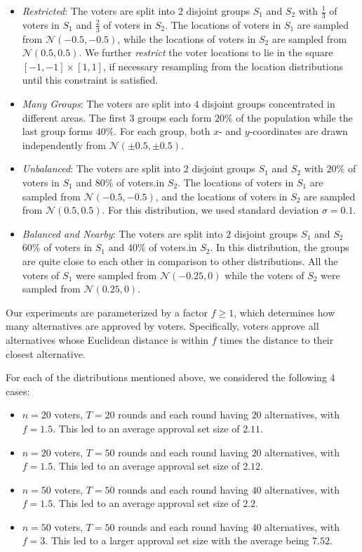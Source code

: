 \documentclass[10pt]{scrartcl}
\theoremstyle{plain}
\theoremstyle{definition}
\renewcommand*{\ge}{\geqslant}
\begin{document}
\begin{itemize}[leftmargin=15pt]
	
	\item \emph{Restricted}: The voters are split into $2$ disjoint groups $S_1$ and $S_2$ with $\frac13$ of voters in $S_1$ and $\frac23$ of voters in $S_2$. The locations of voters in $S_1$ are sampled from $\mathcal{N}(-0.5, -0.5)$, while the locations of voters in $S_2$ are sampled from $\mathcal{N}(0.5, 0.5)$. We further \emph{restrict} the voter locations to lie in the square $[-1, -1] \times [1, 1]$, if necessary resampling from the location distributions until this constraint is satisfied.
	
	\item \emph{Many Groups}: The voters are split into $4$ disjoint groups concentrated in different areas. The first $3$ groups each form $20\%$ of the population while the last group forms $40\%$. For each group, both $x$- and $y$-coordinates are drawn independently from $\mathcal{N}(\pm 0.5, \pm 0.5)$. 
	
	\item \emph{Unbalanced}:  The voters are split into $2$ disjoint groups $S_1$ and $S_2$ with $20\%$ of voters in $S_1$ and $80\%$ of voters.in $S_2$. The locations of voters in $S_1$ are sampled from $\mathcal{N}(-0.5, -0.5)$, and the locations of voters in $S_2$ are sampled from $\mathcal{N}(0.5, 0.5)$. For this distribution, we used standard deviation $\sigma = 0.1$.
	
	\item \emph{Balanced and Nearby}: The voters are split into $2$ disjoint groups $S_1$ and $S_2$ $60\%$ of voters in $S_1$ and $40\%$ of voters.in $S_2$. In this distribution, the groups are quite close to each other in comparison to other distributions. All the voters of $S_1$ were sampled from $\mathcal{N}(-0.25, 0)$ while the voters of $S_2$ were sampled from $\mathcal{N}(0.25, 0)$.
\end{itemize}

Our experiments are parameterized by a factor $f \ge 1$, which determines how many alternatives are approved by voters. Specifically, voters approve all alternatives whose Euclidean distance is within $f$ times the distance to their closest alternative. 

For each of the distributions mentioned above, we considered the following $4$ cases:
\begin{itemize}[leftmargin=15pt]
	\item $n = 20$ voters, $T = 20$ rounds and each round having $20$ alternatives, with $f = 1.5$. This led to an average approval set size of $2.11$. \item $n = 20$ voters, $T = 50$ rounds and each round having $20$ alternatives, with $f = 1.5$. This led to an average approval set size of $2.12$. \item $n = 50$ voters, $T = 50$ rounds and each round having $40$ alternatives, with $f = 1.5$. This led to an average approval set size of $2.2$. \item $n = 50$ voters, $T = 50$ rounds and each round having $40$ alternatives, with $f = 3$. This led to a larger approval set size with the average being $7.52$. \end{itemize}
\end{document}
